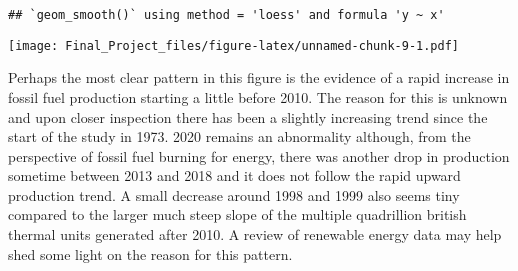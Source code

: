 \documentclass[
]{article}
\newenvironment{Shaded}{\begin{snugshade}}{\end{snugshade}}
\newcommand{\DataTypeTok}[1]{\textcolor[rgb]{0.13,0.29,0.53}{#1}}
\newcommand{\DecValTok}[1]{\textcolor[rgb]{0.00,0.00,0.81}{#1}}
\newcommand{\FloatTok}[1]{\textcolor[rgb]{0.00,0.00,0.81}{#1}}
\newcommand{\KeywordTok}[1]{\textcolor[rgb]{0.13,0.29,0.53}{\textbf{#1}}}
\newcommand{\NormalTok}[1]{#1}
\newcommand{\OperatorTok}[1]{\textcolor[rgb]{0.81,0.36,0.00}{\textbf{#1}}}
\newcommand{\StringTok}[1]{\textcolor[rgb]{0.31,0.60,0.02}{#1}}
\begin{document}
\begin{verbatim}
## `geom_smooth()` using method = 'loess' and formula 'y ~ x'
\end{verbatim}

\texttt{[image: Final\_Project\_files/figure-latex/unnamed-chunk-9-1.pdf]}

Perhaps the most clear pattern in this figure is the evidence of a rapid
increase in fossil fuel production starting a little before 2010. The
reason for this is unknown and upon closer inspection there has been a
slightly increasing trend since the start of the study in 1973. 2020
remains an abnormality although, from the perspective of fossil fuel
burning for energy, there was another drop in production sometime
between 2013 and 2018 and it does not follow the rapid upward production
trend. A small decrease around 1998 and 1999 also seems tiny compared to
the larger much steep slope of the multiple quadrillion british thermal
units generated after 2010. A review of renewable energy data may help
shed some light on the reason for this pattern.

\begin{Shaded}
\end{Shaded}
\end{document}
